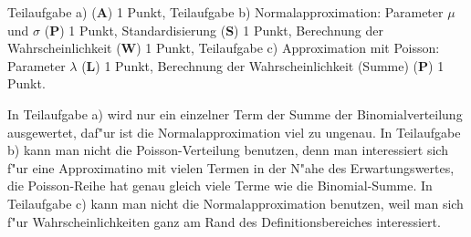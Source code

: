\begin{bewertung}
Teilaufgabe a) ({\bf A}) 1 Punkt,
Teilaufgabe b) Normalapproximation:
Parameter $\mu$ und $\sigma$ ({\bf P}) 1 Punkt,
Standardisierung ({\bf S}) 1 Punkt,
Berechnung der Wahrscheinlichkeit ({\bf W}) 1 Punkt,
Teilaufgabe c) Approximation mit Poisson: Parameter $\lambda$ ({\bf L}) 1 Punkt,
Berechnung der Wahrscheinlichkeit (Summe) ({\bf P}) 1 Punkt.
\end{bewertung}

\begin{diskussion}
In Teilaufgabe a) wird nur ein einzelner Term der Summe der
Binomialverteilung ausgewertet, daf"ur ist die Normalapproximation viel
zu ungenau.
In Teilaufgabe b) kann man nicht die Poisson-Verteilung benutzen, denn
man interessiert sich f"ur eine Approximatino mit vielen Termen in der
N"ahe des Erwartungswertes, die Poisson-Reihe hat genau gleich viele
Terme wie die Binomial-Summe.
In Teilaufgabe c) kann man nicht die Normalapproximation benutzen, weil
man sich f"ur Wahrscheinlichkeiten ganz am Rand des Definitionsbereiches
interessiert.
\end{diskussion}

